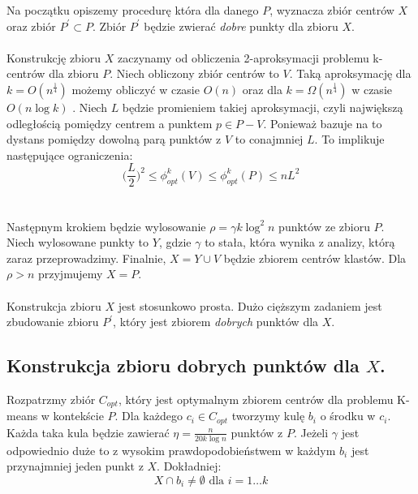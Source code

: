 \noindent
Na początku opiszemy procedurę która dla danego $P$, wyznacza zbiór centrów $X$ oraz zbiór $P^{'} \subset P$.
Zbiór $P^{'}$ będzie zwierać \textit{dobre} punkty dla zbioru $X$.
\\~\\
Konstrukcję zbioru $X$ zaczynamy od obliczenia 2-aproksymacji problemu k-centrów dla zbioru $P$.
Niech obliczony zbiór centrów to $V$.
Taką aproksymację dla $k = O(n^{\frac{1}{4}})$ możemy obliczyć w czasie $O(n)$ oraz dla $k = \Omega(n^{\frac{1}{4}})$ w czasie $O(n \log k)$ \cite{10.1145/62212.62255}.
Niech $L$ będzie promieniem takiej aproksymacji, czyli największą odległością pomiędzy centrem a punktem $p \in P-V$.
Ponieważ \cite{10.1145/62212.62255} bazuje na \cite{Gonzalez1985ClusteringTM} to dystans pomiędzy dowolną parą punktów z $V$ to conajmniej $L$.
To implikuje następujące ograniczenia:
\begin{equation}
    \Big( \frac{L}{2 } \Big)^2 \leq \phi_{opt}^{k}(V) \leq \phi_{opt}^{k}(P) \leq nL^{2}
\end{equation} 
\\~\\
Następnym krokiem będzie wylosowanie $\rho = \gamma k \log^{2} n$ punktów ze zbioru $P$.
Niech wylosowane punkty to $Y$, gdzie $\gamma$ to stała, która wynika z analizy, którą zaraz przeprowadzimy.
Finalnie, $X = Y \cup V$ będzie zbiorem centrów klastów.
Dla $\rho > n$ przyjmujemy $X = P$.
\\~\\
Konstrukcja zbioru $X$ jest stosunkowo prosta.
Dużo cięższym zadaniem jest zbudowanie zbioru $P^{'}$, który jest zbiorem \textit{dobrych} punktów dla $X$.

\subsection{Konstrukcja zbioru dobrych punktów dla $X$.}

Rozpatrzmy zbiór $C_{opt}$, który jest optymalnym zbiorem centrów dla problemu K-means w kontekście $P$.
Dla każdego $c_{i} \in C_{opt}$ tworzymy kulę $b_{i}$ o środku w $c_{i}$.
Każda taka kula będzie zawierać $\eta = \frac{n}{20k \log n}$ punktów z $P$.
Jeżeli $\gamma$ jest odpowiednio duże to z wysokim prawdopodobieństwem w każdym $b_{i}$ jest przynajmniej jeden punkt z $X$.
Dokładniej:
\begin{equation}
    X \cap b_{i} \neq \emptyset \text{ dla } i = 1 \dots k
\end{equation}

